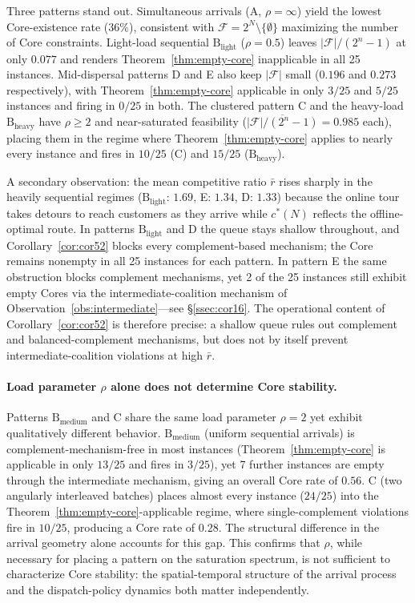 \documentclass[11pt]{article}
\theoremstyle{plain}
\theoremstyle{definition}
\theoremstyle{remark}
\newcommand{\F}{\mathcal{F}}
\newcommand{\cstar}{c^{\ast}}
\begin{document}
Three patterns stand out. Simultaneous arrivals (A, $\rho=\infty$) yield the lowest Core-existence rate ($36\%$), consistent with $\F=2^N\setminus\{\emptyset\}$ maximizing the number of Core constraints. Light-load sequential $\text{B}_{\text{light}}$ ($\rho=0.5$) leaves $|\F|/(2^n-1)$ at only $0.077$ and renders Theorem~\ref{thm:empty-core} inapplicable in all 25 instances. Mid-dispersal patterns D and E also keep $|\F|$ small ($0.196$ and $0.273$ respectively), with Theorem~\ref{thm:empty-core} applicable in only $3/25$ and $5/25$ instances and firing in $0/25$ in both. The clustered pattern C and the heavy-load $\text{B}_{\text{heavy}}$ have $\rho\ge 2$ and near-saturated feasibility ($\overline{|\F|/(2^n-1)}=0.985$ each), placing them in the regime where Theorem~\ref{thm:empty-core} applies to nearly every instance and fires in $10/25$ (C) and $15/25$ ($\text{B}_{\text{heavy}}$).

A secondary observation: the mean competitive ratio $\bar r$ rises sharply in the heavily sequential regimes ($\text{B}_{\text{light}}$: $1.69$, E: $1.34$, D: $1.33$) because the online tour takes detours to reach customers as they arrive while $\cstar(N)$ reflects the offline-optimal route. In patterns $\text{B}_{\text{light}}$ and D the queue stays shallow throughout, and Corollary~\ref{cor:cor52} blocks every complement-based mechanism; the Core remains nonempty in all 25 instances for each pattern. In pattern E the same obstruction blocks complement mechanisms, yet 2 of the 25 instances still exhibit empty Cores via the intermediate-coalition mechanism of Observation~\ref{obs:intermediate}---see \S\ref{ssec:cor16}. The operational content of Corollary~\ref{cor:cor52} is therefore precise: a shallow queue rules out complement and balanced-complement mechanisms, but does not by itself prevent intermediate-coalition violations at high $\bar r$.

\paragraph{Load parameter $\rho$ alone does not determine Core stability.} Patterns $\text{B}_{\text{medium}}$ and C share the same load parameter $\rho=2$ yet exhibit qualitatively different behavior. $\text{B}_{\text{medium}}$ (uniform sequential arrivals) is complement-mechanism-free in most instances (Theorem~\ref{thm:empty-core} is applicable in only $13/25$ and fires in $3/25$), yet 7 further instances are empty through the intermediate mechanism, giving an overall Core rate of $0.56$. C (two angularly interleaved batches) places almost every instance ($24/25$) into the Theorem~\ref{thm:empty-core}-applicable regime, where single-complement violations fire in $10/25$, producing a Core rate of $0.28$. The structural difference in the arrival geometry alone accounts for this gap. This confirms that $\rho$, while necessary for placing a pattern on the saturation spectrum, is not sufficient to characterize Core stability: the spatial-temporal structure of the arrival process and the dispatch-policy dynamics both matter independently.
\end{document}
